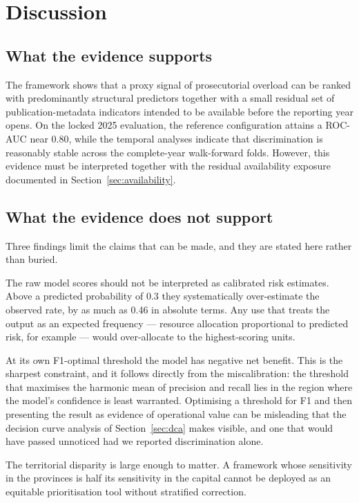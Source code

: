 \documentclass[sn-vancouver,Numbered]{sn-jnl}
\begin{document}
\section{Discussion}\label{sec:discussion}

\subsection{What the evidence supports}

The framework shows that a proxy signal of prosecutorial overload can be ranked with predominantly structural predictors together with a small residual set of publication-metadata indicators intended to be available before the reporting year opens. On the locked 2025 evaluation, the reference configuration attains a ROC-AUC near 0.80, while the temporal analyses indicate that discrimination is reasonably stable across the complete-year walk-forward folds. However, this evidence must be interpreted together with the residual availability exposure documented in Section~\ref{sec:availability}.

\subsection{What the evidence does not support}

Three findings limit the claims that can be made, and they are stated here rather than buried.

The raw model scores should not be interpreted as calibrated risk estimates. Above a predicted probability of 0.3 they systematically over-estimate the observed rate, by as much as 0.46 in absolute terms. Any use that treats the output as an expected frequency --- resource allocation proportional to predicted risk, for example --- would over-allocate to the highest-scoring units.

At its own F1-optimal threshold the model has negative net benefit. This is the sharpest constraint, and it follows directly from the miscalibration: the threshold that maximises the harmonic mean of precision and recall lies in the region where the model's confidence is least warranted. Optimising a threshold for F1 and then presenting the result as evidence of operational value can be misleading that the decision curve analysis of Section~\ref{sec:dca} makes visible, and one that would have passed unnoticed had we reported discrimination alone.

The territorial disparity is large enough to matter. A framework whose sensitivity in the provinces is half its sensitivity in the capital cannot be deployed as an equitable prioritisation tool without stratified correction.
\end{document}

